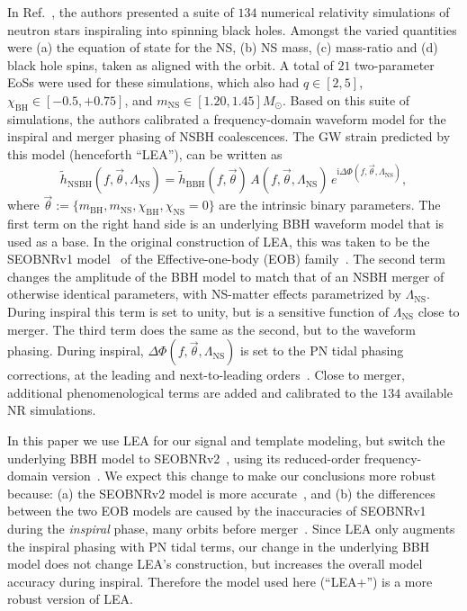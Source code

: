 \documentclass[aps,prd,amsmath,floats,floatfix, twocolumn,
superscriptaddress,nofootinbib,showpacs]{revtex4-1}
\newcommand{\lambdans}{\Lambda_\mathrm{NS}}
\newcommand{\ii}{\mathrm{i}}
\newcommand{\chibh}{\chi_\mathrm{BH}}
\newcommand{\chins}{\chi_\mathrm{NS}}
\newcommand{\mbh}{m_\mathrm{BH}}
\newcommand{\mns}{m_\mathrm{NS}}
\begin{document}
In Ref.~\cite{Lackey:2013axa}, the authors presented a suite of $134$ numerical
relativity simulations of neutron stars inspiraling into spinning black holes. Amongst
the varied quantities were (a) the equation of state for the NS, (b) NS mass, 
(c) mass-ratio and (d) black hole spins, taken as aligned with the orbit.
A total of $21$ two-parameter EoSs were used for these simulations, which also 
had $q\in[2, 5]$, $\chibh\in[-0.5, +0.75]$, and 
$m_\mathrm{NS}\in[1.20, 1.45]M_\odot$. Based on this suite of simulations, the
authors calibrated a frequency-domain waveform model for the inspiral and merger phasing of
NSBH coalescences. The GW strain predicted by this model (henceforth ``LEA''),
can be written as
% 
\begin{equation}
 \tilde{h}_\mathrm{NSBH}(f, \vec{\theta}, \lambdans) = \tilde{h}_\mathrm{BBH}(f, \vec{\theta})\,A(f, \vec{\theta}, \lambdans)\,e^{\ii \Delta\Phi(f, \vec{\theta}, \lambdans)},
\end{equation}
where $\vec{\theta}:=\{\mbh, \mns, \chibh,\chins=0\}$ are the intrinsic binary
parameters. The first term on the right hand side is an underlying
BBH waveform model that is used as a base. In the original construction of LEA,
this was taken to be the SEOBNRv1 model~\cite{Taracchini:2012} of the 
Effective-one-body (EOB) family~\cite{Buonanno99}. The second term changes the 
amplitude of the BBH model
to match that of an NSBH merger of otherwise identical parameters, with NS-matter
effects parametrized by $\lambdans$. During inspiral this term is set to
unity, but is a sensitive function of $\lambdans$ close to merger. The third 
term does the same as the second, but to the waveform phasing. During inspiral,
$\Delta\Phi(f, \vec{\theta}, \lambdans)$ is set to the PN tidal phasing corrections,
at the leading and next-to-leading orders~\cite{Vines2011}. Close to merger,
additional phenomenological terms are added and calibrated to the $134$ available
NR simulations.

In this paper we use LEA for our signal and template modeling, but switch the 
underlying BBH model to SEOBNRv2~\cite{Taracchini:2013rva},
using its reduced-order frequency-domain version~\cite{Purrer:2015tud}. We
expect this change to make our conclusions more robust because: (a) the 
SEOBNRv2 model is more accurate~\cite{Kumar:2015tha,Kumar:2016dhh}, and (b)
the differences between the two EOB models are caused by the
inaccuracies of SEOBNRv1 during the {\it inspiral} phase, many orbits before 
merger~\cite{Kumar:2015tha}.
Since LEA only augments the inspiral phasing with PN tidal terms, our
change in the underlying BBH model does not change LEA's construction, but
increases the overall model accuracy during inspiral. Therefore the model used 
here (``LEA+'') is a more robust version of LEA.
\end{document}
